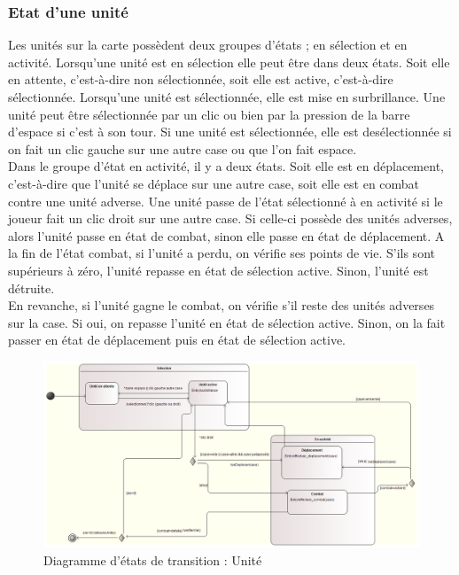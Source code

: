 \documentclass[a4paper,11pt]{article}
\begin{document}
\subsubsection{Etat d'une unité}
Les unités sur la carte possèdent deux groupes d'états ; en sélection et en activité. Lorsqu'une unité est en sélection elle peut être dans deux états. Soit elle en attente, c'est-à-dire non sélectionnée, soit elle est active, c'est-à-dire sélectionnée. Lorsqu'une unité est sélectionnée, elle est mise en surbrillance. Une unité peut être sélectionnée par un clic ou bien par la pression de la barre d'espace si c'est à son tour. Si une unité est sélectionnée, elle est desélectionnée si on fait un clic gauche sur une autre case ou que l'on fait espace.\\
Dans le groupe d'état en activité, il y a deux états. Soit elle est en déplacement, c'est-à-dire que l'unité se déplace sur une autre case, soit elle est en combat contre une unité adverse. 
Une unité passe de l'état sélectionné à en activité si le joueur fait un clic droit sur une autre case. Si celle-ci possède des unités adverses, alors l'unité passe en état de combat, sinon elle passe en état de déplacement. A la fin de l'état combat, si l'unité a perdu, on vérifie ses points de vie. S'ils sont supérieurs à zéro, l'unité repasse en état de sélection active. Sinon, l'unité est détruite.\\
En revanche, si l'unité gagne le combat, on vérifie s'il reste des unités adverses sur la case. Si oui, on repasse l'unité en état de sélection active. Sinon, on la fait passer en état de déplacement puis en état de sélection active. 
\begin{figure}[H]
	\centering
	\includegraphics[width=\textwidth]{fig/diagramme_etat_transition_unite_modelio}
	\caption{Diagramme d'états de transition : Unité}
	\label{det:e}
\end{figure} 
\end{document}
